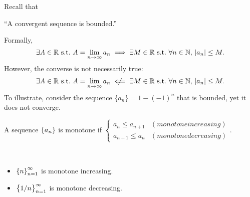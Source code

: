 \documentclass[11pt,openany]{article}
\begin{document}
\newpage
\begin{note}
	Recall that
	\begin{center}
		``A convergent sequence is bounded.''
	\end{center}
Formally, \[
\exists A\in\R\ \text{s.t.}\ A=\lim_{n\to\infty}a_n\implies\exists M\in\R\ \text{s.t.}\ \forall n\in\N,\ \abs{a_n}\leq M.
\]However, the converse is not necessarily true: \[
\exists A\in\R\ \text{s.t.}\ A=\lim_{n\to\infty}a_n\centernot\impliedby\exists M\in\R\ \text{s.t.}\ \forall n\in\N,\ \abs{a_n}\leq M.
\] To illustrate, consider the sequence \(\{a_n\} = 1 - (-1)^n\) that is bounded, yet it does not converge.
\vspace{40pt}
\begin{remark*}
A sequence $\set{a_n}$ is monotone if $\begin{cases*}
	a_n\leq a_{n+1} & (monotone increasing) \\
	a_{n+1}\leq a_n & (monotone decreasing)
\end{cases*}$.
\end{remark*}
\begin{example*}
\ \begin{itemize}
	\item $\set{n}_{n=1}^\infty$ is monotone increasing.
	\item $\set{1/n}_{n=1}^\infty$ is monotone decreasing.
\end{itemize}
\end{example*}

\end{note}
\end{document}
